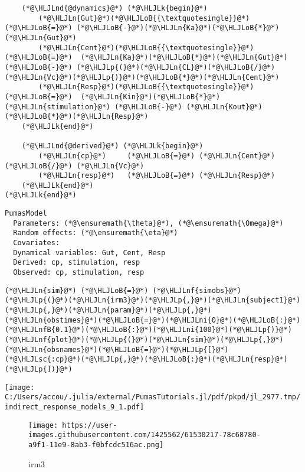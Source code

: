 \documentclass[12pt,a4paper]{article}
\newcommand{\HLJLk}[1]{\textcolor[RGB]{148,91,176}{\textbf{#1}}}
\newcommand{\HLJLn}[1]{#1}
\newcommand{\HLJLnd}[1]{\textcolor[RGB]{214,102,97}{#1}}
\newcommand{\HLJLnf}[1]{\textcolor[RGB]{66,102,213}{#1}}
\newcommand{\HLJLsc}[1]{\textcolor[RGB]{201,61,57}{#1}}
\newcommand{\HLJLnfB}[1]{\textcolor[RGB]{59,151,46}{#1}}
\newcommand{\HLJLni}[1]{\textcolor[RGB]{59,151,46}{#1}}
\newcommand{\HLJLoB}[1]{\textcolor[RGB]{102,102,102}{\textbf{#1}}}
\newcommand{\HLJLp}[1]{#1}
\begin{document}
\begin{lstlisting}
    (*@\HLJLnd{@dynamics}@*) (*@\HLJLk{begin}@*)
        (*@\HLJLn{Gut}@*)(*@\HLJLoB{{\textquotesingle}}@*)    (*@\HLJLoB{=}@*) (*@\HLJLoB{-}@*)(*@\HLJLn{Ka}@*)(*@\HLJLoB{*}@*)(*@\HLJLn{Gut}@*)
        (*@\HLJLn{Cent}@*)(*@\HLJLoB{{\textquotesingle}}@*)   (*@\HLJLoB{=}@*)  (*@\HLJLn{Ka}@*)(*@\HLJLoB{*}@*)(*@\HLJLn{Gut}@*) (*@\HLJLoB{-}@*) (*@\HLJLp{(}@*)(*@\HLJLn{CL}@*)(*@\HLJLoB{/}@*)(*@\HLJLn{Vc}@*)(*@\HLJLp{)}@*)(*@\HLJLoB{*}@*)(*@\HLJLn{Cent}@*)
        (*@\HLJLn{Resp}@*)(*@\HLJLoB{{\textquotesingle}}@*)   (*@\HLJLoB{=}@*)  (*@\HLJLn{Kin}@*)(*@\HLJLoB{*}@*)(*@\HLJLn{stimulation}@*) (*@\HLJLoB{-}@*) (*@\HLJLn{Kout}@*)(*@\HLJLoB{*}@*)(*@\HLJLn{Resp}@*)
    (*@\HLJLk{end}@*)

    (*@\HLJLnd{@derived}@*) (*@\HLJLk{begin}@*)
        (*@\HLJLn{cp}@*)     (*@\HLJLoB{=}@*) (*@\HLJLn{Cent}@*) (*@\HLJLoB{/}@*) (*@\HLJLn{Vc}@*)
        (*@\HLJLn{resp}@*)   (*@\HLJLoB{=}@*) (*@\HLJLn{Resp}@*)
    (*@\HLJLk{end}@*)
(*@\HLJLk{end}@*)
\end{lstlisting}

\begin{lstlisting}
PumasModel
  Parameters: (*@\ensuremath{\theta}@*), (*@\ensuremath{\Omega}@*)
  Random effects: (*@\ensuremath{\eta}@*)
  Covariates: 
  Dynamical variables: Gut, Cent, Resp
  Derived: cp, stimulation, resp
  Observed: cp, stimulation, resp
\end{lstlisting}


\begin{lstlisting}
(*@\HLJLn{sim}@*) (*@\HLJLoB{=}@*) (*@\HLJLnf{simobs}@*)(*@\HLJLp{(}@*)(*@\HLJLn{irm3}@*)(*@\HLJLp{,}@*)(*@\HLJLn{subject1}@*)(*@\HLJLp{,}@*)(*@\HLJLn{param}@*)(*@\HLJLp{,}@*)(*@\HLJLn{obstimes}@*)(*@\HLJLoB{=}@*)(*@\HLJLni{0}@*)(*@\HLJLoB{:}@*)(*@\HLJLnfB{0.1}@*)(*@\HLJLoB{:}@*)(*@\HLJLni{100}@*)(*@\HLJLp{)}@*)
(*@\HLJLnf{plot}@*)(*@\HLJLp{(}@*)(*@\HLJLn{sim}@*)(*@\HLJLp{,}@*) (*@\HLJLn{obsnames}@*)(*@\HLJLoB{=}@*)(*@\HLJLp{[}@*)(*@\HLJLsc{:cp}@*)(*@\HLJLp{,}@*)(*@\HLJLoB{:}@*)(*@\HLJLn{resp}@*)(*@\HLJLp{])}@*)
\end{lstlisting}

\texttt{[image: C:/Users/accou/.julia/external/PumasTutorials.jl/pdf/pkpd/jl\_2977.tmp/indirect\_response\_models\_9\_1.pdf]}

\begin{figure}
\centering
\texttt{[image: https://user-images.githubusercontent.com/1425562/61530217-78c68780-a9f1-11e9-8ab3-f0bfcdc516ac.png]}
\caption{irm3}
\end{figure}
\end{document}
